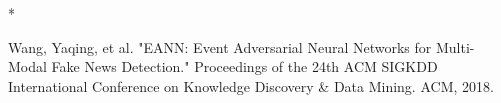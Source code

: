 \documentclass[a4paper,12pt,oneside,openany,uplatex]{jsbook}
\begin{document}

\tableofcontents
%
\mainmatter








\newpage
% 
% 
%
%

\begin{thebibliography} {*}


 Wang, Yaqing, et al.
"EANN: Event Adversarial Neural Networks for Multi-Modal Fake News Detection."
Proceedings of the 24th ACM SIGKDD International Conference on Knowledge Discovery \& Data Mining. ACM, 2018.

\end{thebibliography}

%

%
%
\end{document}
